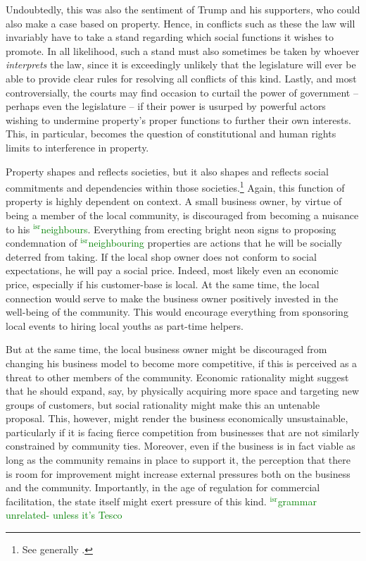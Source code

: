 \documentclass[12pt,a4paper]{book} %
\newcommand{\isr}[1]{\textcolor{green}{$^{\textrm{isr}}${#1}}}
\begin{document}
Undoubtedly, this was also the sentiment of Trump and his supporters, who could also make a case based on property. Hence, in conflicts such as these the law will invariably have to take a stand regarding which social functions it wishes to promote. In all likelihood, such a stand must also sometimes be taken by whoever {\it interprets} the law, since it is exceedingly unlikely that the legislature will ever be able to provide clear rules for resolving all conflicts of this kind. Lastly, and most controversially, the courts may find occasion to curtail the power of government -- perhaps even the legislature -- if their power is usurped by powerful actors wishing to undermine property's proper functions to further their own interests. This, in particular, becomes the question of constitutional and human rights limits to interference in property.

Property shapes and reflects societies, but it also shapes and reflects social commitments and dependencies within those societies.\footnote{See generally \cite{alexander09}.} Again, this function of property is highly dependent on context. A small business owner, by virtue of being a member of the local community, is discouraged from becoming a nuisance to his \isr{neighbours}. Everything from erecting bright neon signs to proposing condemnation of \isr{neighbouring} properties are actions that he will be socially deterred from taking. If the local shop owner does not conform to social expectations, he will pay a social price. Indeed, most likely even an economic price, especially if his customer-base is local. At the same time, the local connection would serve to make the business owner positively invested in the well-being of the community. This would encourage everything from sponsoring local events to hiring local youths as part-time helpers.

But at the same time, the local business owner might be discouraged from changing his business model to become more competitive, if this is perceived as a threat to other members of the community. Economic rationality might suggest that he should expand, say, by physically acquiring more space and targeting new groups of customers, but social rationality might make this an untenable proposal. This, however, might render the business economically unsustainable, particularly if it is facing fierce competition from businesses that are not similarly constrained by community ties. Moreover, even if the business is in fact viable as long as the community remains in place to support it, the perception that there is room for improvement might increase external pressures both on the business and the community. Importantly, in the age of regulation for commercial facilitation, the state itself might exert pressure of this kind. \isr{grammar unrelated- unless it's Tesco}
\end{document}
